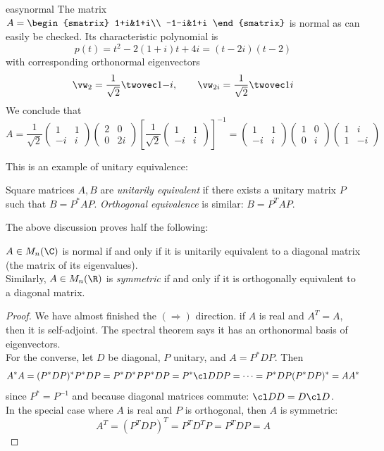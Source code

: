 \begin{example}{}{easynormal}
The matrix $A=\begin{smatrix}
1+i&1+i\\
-1-i&1+i
\end{smatrix}$ is normal as can easily be checked. Its characteristic polynomial is
\[p(t)=t^2-2(1+i)t+4i=(t-2i)(t-2)\]
with corresponding orthonormal eigenvectors
\[\vw_2=\frac 1{\sqrt 2}\twovec 1{-i},\qquad \vw_{2i}=\frac 1{\sqrt 2}\twovec 1i\]
We conclude that
\[A=\frac 1{\sqrt 2}\begin{pmatrix}
1&1\\
-i&i
\end{pmatrix}
\begin{pmatrix}
2&0\\
0&2i
\end{pmatrix}
\left[\frac 1{\sqrt 2}\begin{pmatrix}
1&1\\
-i&i
\end{pmatrix}\right]^{-1}
=\begin{pmatrix}
1&1\\
-i&i
\end{pmatrix}
\begin{pmatrix}
1&0\\
0&i
\end{pmatrix}
\begin{pmatrix}
1&i\\
1&-i
\end{pmatrix}\]
\end{example}

This is an example of unitary equivalence:

\begin{defn}{}{}
Square matrices $A,B$ are \emph{unitarily equivalent} if there exists a unitary matrix $P$ such that $B=P^*AP$. \emph{Orthogonal equivalence} is similar: $B=P^TAP$.
\end{defn}

The above discussion proves half the following:

\begin{thm}{}{}
$A\in M_n(\C)$ is normal if and only if it is unitarily equivalent to a diagonal matrix (the matrix of its eigenvalues).\\
Similarly, $A\in M_n(\R)$ is \emph{symmetric} if and only if it is orthogonally equivalent to a diagonal matrix. 
\end{thm}

\begin{proof}
We have almost finished the $(\Rightarrow)$ direction. if $A$ is real and $A^T=A$, then it is self-adjoint. The spectral theorem says it has an orthonormal basis of eigenvectors.\\[5pt]
For the converse, let $D$ be diagonal, $P$ unitary, and $A=P^*DP$. Then
\[A^*A=(P^*DP)^*P^*DP=P^*D^*PP^*DP=P^*\cl DDP=\cdots =P^*DP(P^*DP)^*=AA^*\]
since $P^*=P^{-1}$ and because diagonal matrices commute: $\cl DD=D\cl D$.\\[5pt]
In the special case where $A$ is real and $P$ is orthogonal, then $A$ is symmetric:
\[A^T=(P^TDP)^T=P^TD^TP=P^TDP=A\tag*{\qedhere}\]
\end{proof}


